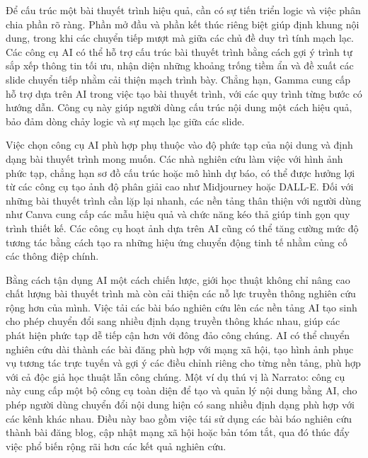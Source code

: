 Để cấu trúc một bài thuyết trình hiệu quả, cần có sự tiến triển logic và việc phân chia phần rõ ràng. Phần mở đầu và phần kết thúc riêng biệt giúp định khung nội dung, trong khi các chuyển tiếp mượt mà giữa các chủ đề duy trì tính mạch lạc. Các công cụ AI có thể hỗ trợ cấu trúc bài thuyết trình bằng cách gợi ý trình tự sắp xếp thông tin tối ưu, nhận diện những khoảng trống tiềm ẩn và đề xuất các slide chuyển tiếp nhằm cải thiện mạch trình bày. Chẳng hạn, Gamma cung cấp hỗ trợ dựa trên AI trong việc tạo bài thuyết trình, với các quy trình từng bước có hướng dẫn. Công cụ này giúp người dùng cấu trúc nội dung một cách hiệu quả, bảo đảm dòng chảy logic và sự mạch lạc giữa các slide.

Việc chọn công cụ AI phù hợp phụ thuộc vào độ phức tạp của nội dung và định dạng bài thuyết trình mong muốn. Các nhà nghiên cứu làm việc với hình ảnh phức tạp, chẳng hạn sơ đồ cấu trúc hoặc mô hình dự báo, có thể được hưởng lợi từ các công cụ tạo ảnh độ phân giải cao như Midjourney hoặc DALL-E. Đối với những bài thuyết trình cần lặp lại nhanh, các nền tảng thân thiện với người dùng như Canva cung cấp các mẫu hiệu quả và chức năng kéo thả giúp tinh gọn quy trình thiết kế. Các công cụ hoạt ảnh dựa trên AI cũng có thể tăng cường mức độ tương tác bằng cách tạo ra những hiệu ứng chuyển động tinh tế nhằm củng cố các thông điệp chính.

Bằng cách tận dụng AI một cách chiến lược, giới học thuật không chỉ nâng cao chất lượng bài thuyết trình mà còn cải thiện các nỗ lực truyền thông nghiên cứu rộng hơn của mình. Việc tải các bài báo nghiên cứu lên các nền tảng AI tạo sinh cho phép chuyển đổi sang nhiều định dạng truyền thông khác nhau, giúp các phát hiện phức tạp dễ tiếp cận hơn với đông đảo công chúng. AI có thể chuyển nghiên cứu dài thành các bài đăng phù hợp với mạng xã hội, tạo hình ảnh phục vụ tương tác trực tuyến và gợi ý các điều chỉnh riêng cho từng nền tảng, phù hợp với cả độc giả học thuật lẫn công chúng. Một ví dụ thú vị là Narrato: công cụ này cung cấp một bộ công cụ toàn diện để tạo và quản lý nội dung bằng AI, cho phép người dùng chuyển đổi nội dung hiện có sang nhiều định dạng phù hợp với các kênh khác nhau. Điều này bao gồm việc tái sử dụng các bài báo nghiên cứu thành bài đăng blog, cập nhật mạng xã hội hoặc bản tóm tắt, qua đó thúc đẩy việc phổ biến rộng rãi hơn các kết quả nghiên cứu.

